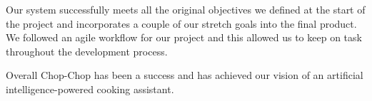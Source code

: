 \documentclass{article}
\begin{document}
Our system successfully meets all the original objectives we defined at the start of the project and incorporates a couple of our stretch goals into the final product. We followed an agile workflow for our project and this allowed us to keep on task throughout the development process.

Overall Chop-Chop has been a success and has achieved our vision of an artificial intelligence-powered cooking assistant.

\pagebreak







\end{document}
